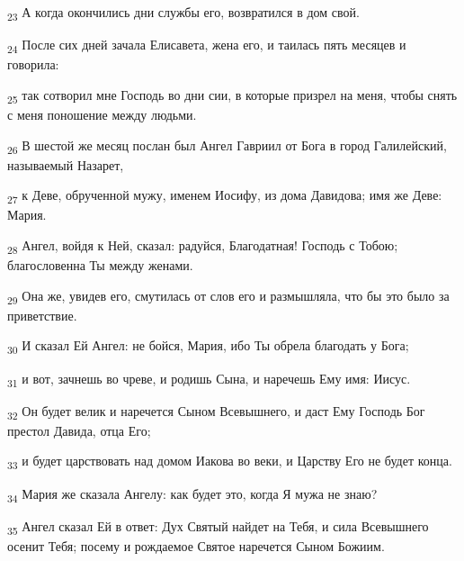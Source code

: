 \begin{tcolorbox}
\textsubscript{23} А когда окончились дни службы его, возвратился в дом свой.
\end{tcolorbox}
\begin{tcolorbox}
\textsubscript{24} После сих дней зачала Елисавета, жена его, и таилась пять месяцев и говорила:
\end{tcolorbox}
\begin{tcolorbox}
\textsubscript{25} так сотворил мне Господь во дни сии, в которые призрел на меня, чтобы снять с меня поношение между людьми.
\end{tcolorbox}
\begin{tcolorbox}
\textsubscript{26} В шестой же месяц послан был Ангел Гавриил от Бога в город Галилейский, называемый Назарет,
\end{tcolorbox}
\begin{tcolorbox}
\textsubscript{27} к Деве, обрученной мужу, именем Иосифу, из дома Давидова; имя же Деве: Мария.
\end{tcolorbox}
\begin{tcolorbox}
\textsubscript{28} Ангел, войдя к Ней, сказал: радуйся, Благодатная! Господь с Тобою; благословенна Ты между женами.
\end{tcolorbox}
\begin{tcolorbox}
\textsubscript{29} Она же, увидев его, смутилась от слов его и размышляла, что бы это было за приветствие.
\end{tcolorbox}
\begin{tcolorbox}
\textsubscript{30} И сказал Ей Ангел: не бойся, Мария, ибо Ты обрела благодать у Бога;
\end{tcolorbox}
\begin{tcolorbox}
\textsubscript{31} и вот, зачнешь во чреве, и родишь Сына, и наречешь Ему имя: Иисус.
\end{tcolorbox}
\begin{tcolorbox}
\textsubscript{32} Он будет велик и наречется Сыном Всевышнего, и даст Ему Господь Бог престол Давида, отца Его;
\end{tcolorbox}
\begin{tcolorbox}
\textsubscript{33} и будет царствовать над домом Иакова во веки, и Царству Его не будет конца.
\end{tcolorbox}
\begin{tcolorbox}
\textsubscript{34} Мария же сказала Ангелу: как будет это, когда Я мужа не знаю?
\end{tcolorbox}
\begin{tcolorbox}
\textsubscript{35} Ангел сказал Ей в ответ: Дух Святый найдет на Тебя, и сила Всевышнего осенит Тебя; посему и рождаемое Святое наречется Сыном Божиим.
\end{tcolorbox}
